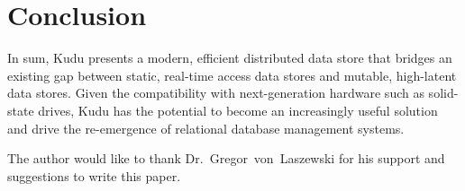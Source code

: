 \section{Conclusion}

In sum, Kudu presents a modern, efficient distributed data store that bridges an existing gap between static, real-time access data stores and mutable, high-latent data stores. Given the compatibility with next-generation hardware such as solid-state drives, Kudu has the potential to become an increasingly useful solution and drive the re-emergence of relational database management systems. 


\begin{acks}

  The author would like to thank Dr.~Gregor~von~Laszewski for his
  support and suggestions to write this paper.

\end{acks}


 

